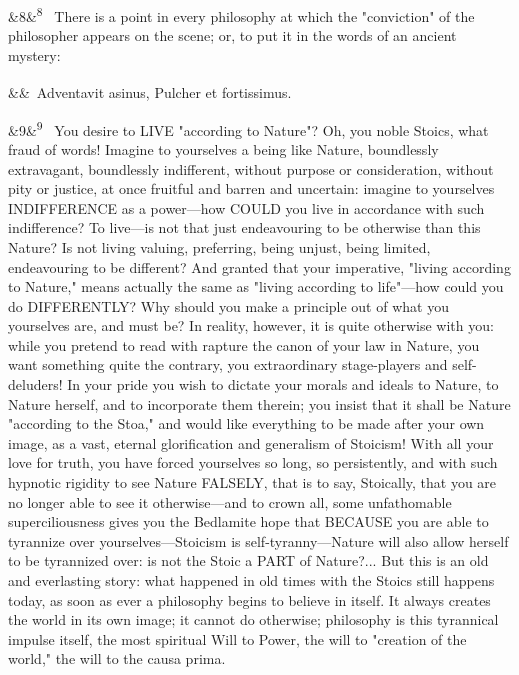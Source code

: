 \documentclass[12pt]{article}
\newcommand{\para}[1][]{\par\noindent\ifx&#1&\else\textsuperscript{\footnotesize #1}~\fi}
\begin{document}
\para[8] There is a point in every philosophy at which the "conviction" of the philosopher appears on the scene; or, to put it in the words of an ancient mystery:

\para Adventavit asinus, Pulcher et fortissimus.

\para[9] You desire to LIVE "according to Nature"? Oh, you noble Stoics, what fraud of words! Imagine to yourselves a being like Nature, boundlessly extravagant, boundlessly indifferent, without purpose or consideration, without pity or justice, at once fruitful and barren and uncertain: imagine to yourselves INDIFFERENCE as a power---how COULD you live in accordance with such indifference? To live---is not that just endeavouring to be otherwise than this Nature? Is not living valuing, preferring, being unjust, being limited, endeavouring to be different? And granted that your imperative, "living according to Nature," means actually the same as "living according to life"---how could you do DIFFERENTLY? Why should you make a principle out of what you yourselves are, and must be? In reality, however, it is quite otherwise with you: while you pretend to read with rapture the canon of your law in Nature, you want something quite the contrary, you extraordinary stage-players and self-deluders! In your pride you wish to dictate your morals and ideals to Nature, to Nature herself, and to incorporate them therein; you insist that it shall be Nature "according to the Stoa," and would like everything to be made after your own image, as a vast, eternal glorification and generalism of Stoicism! With all your love for truth, you have forced yourselves so long, so persistently, and with such hypnotic rigidity to see Nature FALSELY, that is to say, Stoically, that you are no longer able to see it otherwise---and to crown all, some unfathomable superciliousness gives you the Bedlamite hope that BECAUSE you are able to tyrannize over yourselves---Stoicism is self-tyranny---Nature will also allow herself to be tyrannized over: is not the Stoic a PART of Nature?... But this is an old and everlasting story: what happened in old times with the Stoics still happens today, as soon as ever a philosophy begins to believe in itself. It always creates the world in its own image; it cannot do otherwise; philosophy is this tyrannical impulse itself, the most spiritual Will to Power, the will to "creation of the world," the will to the causa prima.
\end{document}
